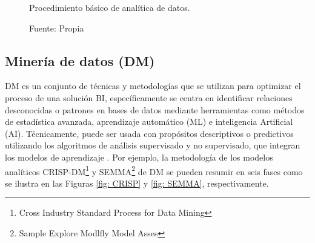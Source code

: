 \documentclass[12pt,jou]{apa7}
\begin{document}
\begin{figure}[h]
\caption{Procedimiento básico de analítica de datos.}
\centering
{}
	\caption*{Fuente: Propia} \label{fig: analitica}	
\end{figure}

\subsection{Minería de datos (DM)}
DM es un conjunto de técnicas y metodologías que se utilizan para optimizar el proceso de una solución BI, específicamente se centra en identificar relaciones desconocidas o patrones en bases de datos mediante herramientas como métodos de estadística avanzada, aprendizaje automático (ML) e inteligencia Artificial (AI). Técnicamente, puede ser usada con propósitos descriptivos o predictivos utilizando los algoritmos de análisis supervisado y no supervisado, que integran los modelos de aprendizaje \cite{Joyanes}. Por ejemplo, la metodología de los modelos analíticos CRISP-DM\footnote{Cross Industry Standard Process for Data Mining} y SEMMA\footnote{Sample Explore Modlfly Model Asses} de DM se pueden resumir en seis fases como se ilustra en las Figuras \ref{fig: CRISP} y \ref{fig: SEMMA}, respectivamente.
\end{document}
